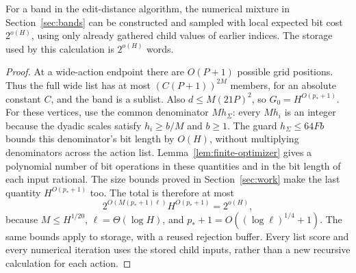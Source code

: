\begin{corollary}
\label{cor:online-local-cost}
For a band in the edit-distance algorithm, the numerical mixture in
Section~\ref{sec:bands} can be constructed and sampled with local
expected bit cost $2^{o(H)}$, using only already gathered child values
of earlier indices.  The storage used by this calculation is
$2^{o(H)}$ words.
\end{corollary}

\begin{proof}
At a wide-action endpoint there are $O(P+1)$ possible grid positions.
Thus the full wide list has at most $(C(P+1))^{2M}$ members, for an
absolute constant $C$, and the band is a sublist.  Also
$d\le M(21P)^2$, so $G_0=H^{O(p_*+1)}$.
For these vertices, use the common denominator $Mh_\Sigma$:
every $Mh_i$ is an integer because the dyadic scales satisfy
$h_i\ge b/M$ and $b\ge1$.  The guard $h_\Sigma\le64Fb$
bounds this denominator's bit length by $O(H)$, without multiplying
denominators across the action list.
Lemma~\ref{lem:finite-optimizer} gives a polynomial number of bit
operations in these quantities and in the bit length of each input
rational.  The size bounds proved in Section~\ref{sec:work} make the last
quantity $H^{O(p_*+1)}$ too.  The total is therefore at most
\[
 2^{O(M(p_*+1)\ell)}H^{O(p_*+1)}=2^{o(H)},
\]
because $M\le H^{1/20}$, $\ell=\Theta(\log H)$, and
$p_*+1=O((\log\ell)^{1/4}+1)$.
The same bounds apply to storage, with a reused rejection buffer.
Every list score and every numerical iteration uses the stored child
inputs, rather than a new recursive calculation for each action.
\end{proof}
